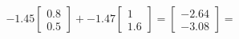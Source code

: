 \documentclass[preview]{standalone}
\begin{document}
\begin{align*}
-1.45 \begin{bmatrix} 0.8 \\ 0.5 \end{bmatrix} + -1.47 \begin{bmatrix} 1 \\ 1.6 \end{bmatrix} = \begin{bmatrix} -2.64 \\ -3.08 \end{bmatrix} =
\end{align*}
\end{document}

